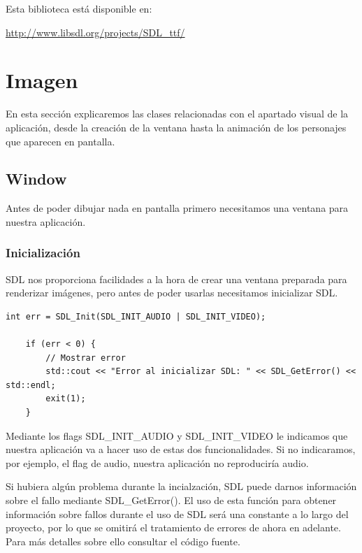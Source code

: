 \documentclass[parskip=half*]{scrartcl}
\begin{document}
	Esta biblioteca est\'a disponible en: \\

	\centerline{\url{http://www.libsdl.org/projects/SDL_ttf/}}


\newpage
\section{Imagen}
En esta secci\'on explicaremos las clases relacionadas con el apartado visual de la aplicaci\'on, desde la creaci\'on de la ventana hasta la animaci\'on de los personajes que aparecen en pantalla.
	\subsection{Window}
	Antes de poder dibujar nada en pantalla primero necesitamos una ventana para nuestra aplicaci\'on.
		\subsubsection{Inicializaci\'on}
			SDL nos proporciona facilidades a la hora de crear una ventana preparada para renderizar im\'agenes, pero antes de poder usarlas necesitamos inicializar SDL.

			\begin{lstlisting}
int err = SDL_Init(SDL_INIT_AUDIO | SDL_INIT_VIDEO);
    
    if (err < 0) {
        // Mostrar error
        std::cout << "Error al inicializar SDL: " << SDL_GetError() << std::endl;
        exit(1);
    }
			\end{lstlisting}

			Mediante los flags SDL\_INIT\_AUDIO y SDL\_INIT\_VIDEO le indicamos que nuestra aplicaci\'on va a hacer uso de estas dos funcionalidades. Si no indicaramos, por ejemplo, el flag de audio, nuestra aplicaci\'on no reproducir\'ia audio.

			Si hubiera alg\'un problema durante la incialzaci\'on, SDL puede darnos informaci\'on sobre el fallo mediante SDL\_GetError(). El uso de esta funci\'on para obtener informaci\'on sobre fallos durante el uso de SDL ser\'a una constante a lo largo del proyecto, por lo que se omitir\'a el tratamiento de errores de ahora en adelante. Para m\'as detalles sobre ello consultar el c\'odigo fuente.
\end{document}
